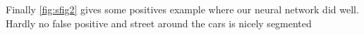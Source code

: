 Finally \cref{fig:sfig2} gives some positives example where our neural network did well. Hardly no false positive and street around the cars is nicely segmented
















%
